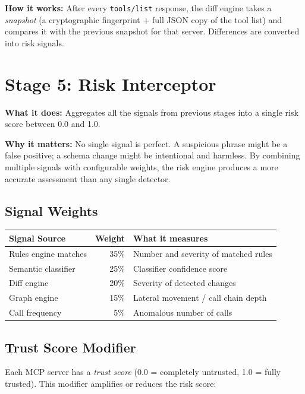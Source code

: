 \documentclass[12pt,a4paper]{report}
\begin{document}
\textbf{How it works:} After every \texttt{tools/list} response, the diff
engine takes a \textit{snapshot} (a cryptographic fingerprint + full JSON copy
of the tool list) and compares it with the previous snapshot for that server.
Differences are converted into risk signals.

\section{Stage 5: Risk Interceptor}

\textbf{What it does:} Aggregates all the signals from previous stages into a
single risk score between 0.0 and 1.0.

\textbf{Why it matters:} No single signal is perfect. A suspicious phrase
might be a false positive; a schema change might be intentional and harmless.
By combining multiple signals with configurable weights, the risk engine
produces a more accurate assessment than any single detector.

\subsection{Signal Weights}

\begin{center}
\begin{tabular}{lrl}
  \toprule
  \textbf{Signal Source} & \textbf{Weight} & \textbf{What it measures} \\
  \midrule
  Rules engine matches & 35\% & Number and severity of matched rules \\
  Semantic classifier & 25\% & Classifier confidence score \\
  Diff engine & 20\% & Severity of detected changes \\
  Graph engine & 15\% & Lateral movement / call chain depth \\
  Call frequency & 5\% & Anomalous number of calls \\
  \bottomrule
\end{tabular}
\end{center}

\subsection{Trust Score Modifier}

Each MCP server has a \textit{trust score} (0.0 = completely untrusted,
1.0 = fully trusted). This modifier amplifies or reduces the risk score:
\end{document}
